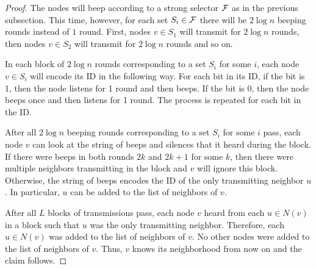 \learningneighthm*
{}

\begin{proof}
The nodes will beep according to a strong selector $\mathcal{F}$ as in the previous subsection. This time, however, for each set $S_i \in \mathcal{F}$ there will be $2\log n$ beeping rounds instead of $1$ round. First, nodes $v \in S_1$ will transmit for $2\log n$ rounds, then nodes $v \in S_2$ will transmit for $2\log n$ rounds and so on.

In each block of $2\log n$ rounds corresponding to a set $S_i$ for some $i$, each node $v \in S_i$ will encode its ID in the following way. For each bit in its ID, if the bit is 1, then the node listens for 1 round and then beeps. If the bit is 0, then the node beeps once and then listens for 1 round. The process is repeated for each bit in the ID.

After all $2\log n$ beeping rounds corresponding to a set $S_i$ for some $i$ pass, each node $v$ can look at the string of beeps and silences that it heard during the block. If there were beeps in both rounds $2k$ and $2k+1$ for some $k$, then there were multiple neighbors transmitting in the block and $v$ will ignore this block. Otherwise, the string of beeps encodes the ID of the only transmitting neighbor $u$. 
In particular, $u$ can be added to the list of neighbors of $v$. 

After all $L$ blocks of transmissions pass, each node $v$ heard from each $u \in N(v)$ in a block such that $u$ was the only transmitting neighbor. Therefore, each $u \in N(v)$ was added to the list of neighbors of $v$. No other nodes were added to the list of neighbors of $v$. Thus, $v$ knows its neighborhood from now on and the claim follows.
\end{proof}

